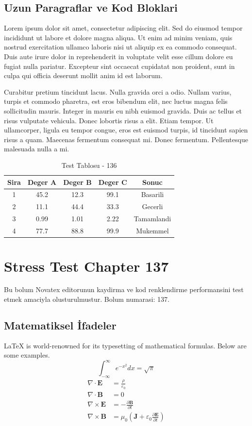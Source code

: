 \documentclass[12pt,a4paper]{article}
\begin{document}
\subsection{Uzun Paragraflar ve Kod Bloklari}
Lorem ipsum dolor sit amet, consectetur adipiscing elit. Sed do eiusmod tempor incididunt ut labore et dolore magna aliqua. Ut enim ad minim veniam, quis nostrud exercitation ullamco laboris nisi ut aliquip ex ea commodo consequat. Duis aute irure dolor in reprehenderit in voluptate velit esse cillum dolore eu fugiat nulla pariatur. Excepteur sint occaecat cupidatat non proident, sunt in culpa qui officia deserunt mollit anim id est laborum.

Curabitur pretium tincidunt lacus. Nulla gravida orci a odio. Nullam varius, turpis et commodo pharetra, est eros bibendum elit, nec luctus magna felis sollicitudin mauris. Integer in mauris eu nibh euismod gravida. Duis ac tellus et risus vulputate vehicula. Donec lobortis risus a elit. Etiam tempor. Ut ullamcorper, ligula eu tempor congue, eros est euismod turpis, id tincidunt sapien risus a quam. Maecenas fermentum consequat mi. Donec fermentum. Pellentesque malesuada nulla a mi.

\begin{table}[h!]
\centering
\begin{tabular}{|c|c|c|c|c|}
\hline
\textbf{Sira} & \textbf{Deger A} & \textbf{Deger B} & \textbf{Deger C} & \textbf{Sonuc} \\
\hline
1 & 45.2 & 12.3 & 99.1 & Basarili \\
2 & 11.1 & 44.4 & 33.3 & Gecerli \\
3 & 0.99 & 1.01 & 2.22 & Tamamlandi \\
4 & 77.7 & 88.8 & 99.9 & Mukemmel \\
\hline
\end{tabular}
\caption{Test Tablosu - 136}
\end{table}

\newpage
\section{Stress Test Chapter 137}
Bu bolum Novatex editorunun kaydirma ve kod renklendirme performansini test etmek amaciyla olusturulmustur. Bolum numarasi: 137.

\subsection{Matematiksel İfadeler}
\LaTeX{} is world-renowned for its typesetting of mathematical formulas. Below are some examples.
\begin{equation}
\int_{-\infty}^{\infty} e^{-x^2} dx = \sqrt{\pi}
\end{equation}
\begin{align}
\nabla \cdot \mathbf{E} &= \frac{\rho}{\varepsilon_0} \\
\nabla \cdot \mathbf{B} &= 0 \\
\nabla \times \mathbf{E} &= -\frac{\partial \mathbf{B}}{\partial t} \\
\nabla \times \mathbf{B} &= \mu_0\left(\mathbf{J} + \varepsilon_0 \frac{\partial \mathbf{E}}{\partial t}\right)
\end{align}
\end{document}

